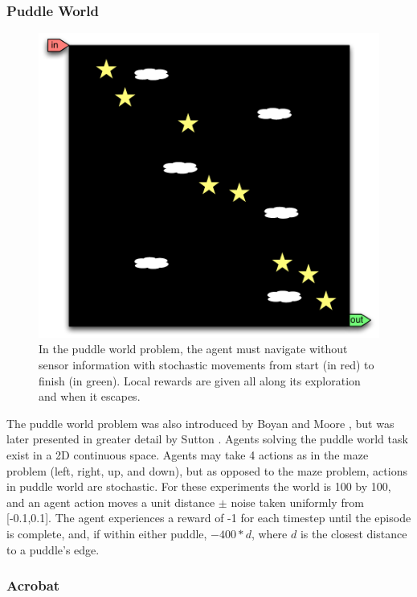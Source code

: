 \subsubsection{Puddle World}
\begin{figure}[h]
\center
\includegraphics[width=0.75\linewidth]{PW_problem.pdf}
\caption{In the puddle world problem, the agent must navigate without sensor information with stochastic movements from start (in red) to finish (in green). Local rewards are given all along its exploration and when it escapes.}\label{fig:MC:problem}
\end{figure}

The puddle world problem was also introduced by Boyan and Moore \cite{Boyan1995}, but was later presented in greater detail by Sutton \cite{sutton1996generalization}. Agents solving the puddle world task exist in a 2D continuous space. Agents may take 4 actions as in the maze problem (left, right, up, and down), but as opposed to the maze problem, actions in puddle world are stochastic. For these experiments the world is 100 by 100, and an agent action moves a unit distance $\pm$ noise taken uniformly from [-0.1,0.1]. The agent experiences a reward of -1 for each timestep until the episode is complete, and, if within either puddle, $-400*d$, where $d$ is the closest distance to a puddle's edge.


\subsubsection{Acrobat}

